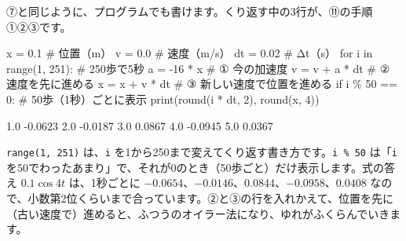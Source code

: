 ⑦と同じように、プログラムでも書けます。くり返す中の3行が、⑪の手順①②③です。\par\nobreak
\begin{bkcode}[Python]
x = 0.1           \# 位置（m）
v = 0.0           \# 速度（m/s）
dt = 0.02         \# Δt（s）
for i in range(1, 251):          \# 250歩で5秒
    a = -16 * x                  \# ① 今の加速度
    v = v + a * dt               \# ② 速度を先に進める
    x = x + v * dt               \# ③ 新しい速度で位置を進める
    if i \% 50 == 0:              \# 50歩（1秒）ごとに表示
        print(round(i * dt, 2), round(x, 4))
\end{bkcode}
\begin{bkcodeout}
1.0 -0.0623
2.0 -0.0187
3.0 0.0867
4.0 -0.0945
5.0 0.0367
\end{bkcodeout}
\texttt{range(1, 251)} は、\texttt{i} を1から250まで変えてくり返す書き方です。\texttt{i \% 50} は「\texttt{i} を50でわったあまり」で、それが0のとき（50歩ごと）だけ表示します。式の答え $0.1\cos4t$ は、1秒ごとに $-0.0654$、$-0.0146$、$0.0844$、$-0.0958$、$0.0408$ なので、小数第2位くらいまで合っています。②と③の行を入れかえて、位置を先に（古い速度で）進めると、ふつうのオイラー法になり、ゆれがふくらんでいきます。

